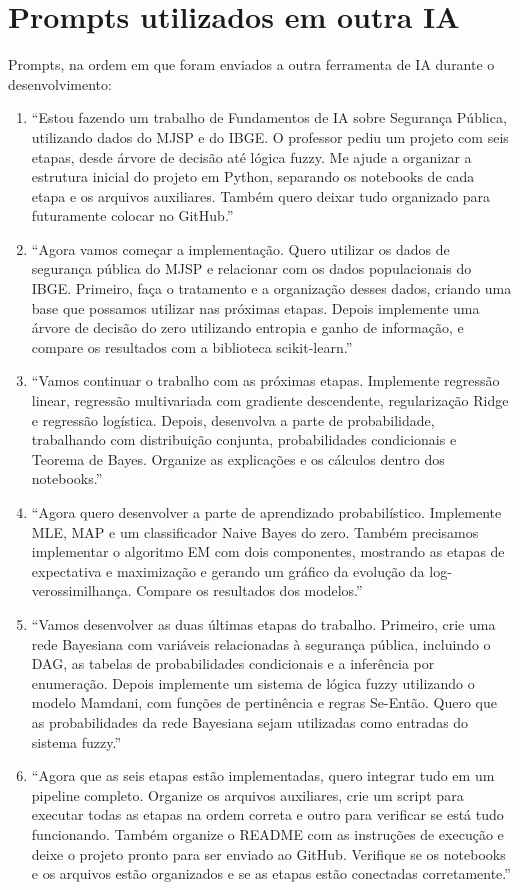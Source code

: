 \documentclass[12pt,a4paper]{article}
\begin{document}
\section{Prompts utilizados em outra IA}
Prompts, na ordem em que foram enviados a outra ferramenta de IA durante o desenvolvimento:
\begin{enumerate}\small\setlength{\itemsep}{1pt}\setlength{\topsep}{1pt}\setlength{\parsep}{0pt}
\item ``Estou fazendo um trabalho de Fundamentos de IA sobre Segurança Pública, utilizando dados do MJSP e do IBGE. O professor pediu um projeto com seis etapas, desde árvore de decisão até lógica fuzzy. Me ajude a organizar a estrutura inicial do projeto em Python, separando os notebooks de cada etapa e os arquivos auxiliares. Também quero deixar tudo organizado para futuramente colocar no GitHub.''
\item ``Agora vamos começar a implementação. Quero utilizar os dados de segurança pública do MJSP e relacionar com os dados populacionais do IBGE. Primeiro, faça o tratamento e a organização desses dados, criando uma base que possamos utilizar nas próximas etapas. Depois implemente uma árvore de decisão do zero utilizando entropia e ganho de informação, e compare os resultados com a biblioteca scikit-learn.''
\item ``Vamos continuar o trabalho com as próximas etapas. Implemente regressão linear, regressão multivariada com gradiente descendente, regularização Ridge e regressão logística. Depois, desenvolva a parte de probabilidade, trabalhando com distribuição conjunta, probabilidades condicionais e Teorema de Bayes. Organize as explicações e os cálculos dentro dos notebooks.''
\item ``Agora quero desenvolver a parte de aprendizado probabilístico. Implemente MLE, MAP e um classificador Naive Bayes do zero. Também precisamos implementar o algoritmo EM com dois componentes, mostrando as etapas de expectativa e maximização e gerando um gráfico da evolução da log-verossimilhança. Compare os resultados dos modelos.''
\item ``Vamos desenvolver as duas últimas etapas do trabalho. Primeiro, crie uma rede Bayesiana com variáveis relacionadas à segurança pública, incluindo o DAG, as tabelas de probabilidades condicionais e a inferência por enumeração. Depois implemente um sistema de lógica fuzzy utilizando o modelo Mamdani, com funções de pertinência e regras Se-Então. Quero que as probabilidades da rede Bayesiana sejam utilizadas como entradas do sistema fuzzy.''
\item ``Agora que as seis etapas estão implementadas, quero integrar tudo em um pipeline completo. Organize os arquivos auxiliares, crie um script para executar todas as etapas na ordem correta e outro para verificar se está tudo funcionando. Também organize o README com as instruções de execução e deixe o projeto pronto para ser enviado ao GitHub. Verifique se os notebooks e os arquivos estão organizados e se as etapas estão conectadas corretamente.''
\end{enumerate}
\end{document}
